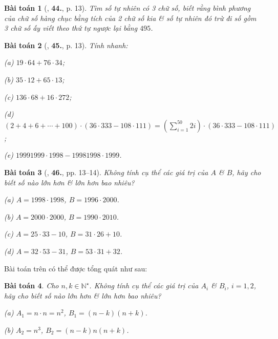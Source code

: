 \documentclass{article}
\numberwithin{equation}{section}
\newtheorem{baitoan}{Bài toán}[section]
\begin{document}
\begin{baitoan}[\cite{Binh_Toan_6_tap_1}, \textbf{44.}, p. 13]
	Tìm số tự nhiên có 3 chữ số, biết rằng bình phương của chữ số hàng chục bằng tích của 2 chữ số kia \& số tự nhiên đó trừ đi số gồm 3 chữ số ấy viết theo thứ tự ngược lại bằng $495$.
\end{baitoan}

\begin{baitoan}[\cite{Binh_Toan_6_tap_1}, \textbf{45.}, p. 13]
	Tính nhanh:
	\begin{enumerate*}
		\item[(a)] $19\cdot 64 + 76\cdot 34$;
		\item[(b)] $35\cdot 12 + 65\cdot 13$;
		\item[(c)] $136\cdot 68 + 16\cdot 272$;
		\item[(d)] $(2 + 4 + 6 + \cdots + 100)\cdot(36\cdot 333 - 108\cdot 111) = \left(\sum_{i=1}^{50} 2i\right)\cdot(36\cdot 333 - 108\cdot 111)$;		
		\item[(e)] $19991999\cdot 1998 - 19981998\cdot 1999$.
	\end{enumerate*}
\end{baitoan}

\begin{baitoan}[\cite{Binh_Toan_6_tap_1}, \textbf{46.}, pp. 13--14]
	Không tính cụ thể các giá trị của $A$ \& $B$, hãy cho biết số nào lớn hơn \& lớn hơn bao nhiêu?
	\begin{enumerate*}
		\item[(a)] $A = 1998\cdot 1998$, $B = 1996\cdot 2000$.
		\item[(b)] $A = 2000\cdot 2000$, $B = 1990\cdot 2010$.
		\item[(c)] $A = 25\cdot 33 - 10$, $B = 31\cdot 26 + 10$.
		\item[(d)] $A = 32\cdot 53 - 31$, $B = 53\cdot 31 + 32$.
	\end{enumerate*}
\end{baitoan}
Bài toán trên có thể được tổng quát như sau:

\begin{baitoan}
	Cho $n,k\in\mathbb{N}^\star$. Không tính cụ thể các giá trị của $A_i$ \& $B_i$, $i = 1,2$, hãy cho biết số nào lớn hơn \& lớn hơn bao nhiêu?
	\begin{enumerate*}
		\item[(a)] $A_1 = n\cdot n = n^2$, $B_1 = (n - k)(n + k)$.
		\item[(b)] $A_2 = n^3$, $B_2 = (n - k)n(n + k)$.
	\end{enumerate*}	
\end{baitoan}
\end{document}
